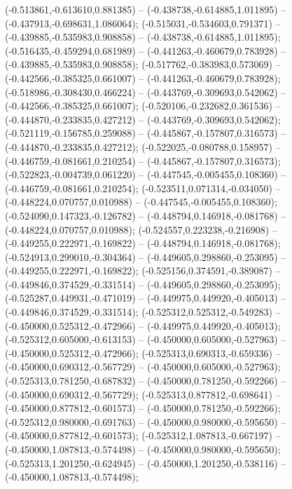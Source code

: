  (-0.513861,-0.613610,0.881385) -- (-0.438738,-0.614885,1.011895) -- (-0.437913,-0.698631,1.086064);
 (-0.515031,-0.534603,0.791371) -- (-0.439885,-0.535983,0.908858) -- (-0.438738,-0.614885,1.011895);
 (-0.516435,-0.459294,0.681989) -- (-0.441263,-0.460679,0.783928) -- (-0.439885,-0.535983,0.908858);
 (-0.517762,-0.383983,0.573069) -- (-0.442566,-0.385325,0.661007) -- (-0.441263,-0.460679,0.783928);
 (-0.518986,-0.308430,0.466224) -- (-0.443769,-0.309693,0.542062) -- (-0.442566,-0.385325,0.661007);
 (-0.520106,-0.232682,0.361536) -- (-0.444870,-0.233835,0.427212) -- (-0.443769,-0.309693,0.542062);
 (-0.521119,-0.156785,0.259088) -- (-0.445867,-0.157807,0.316573) -- (-0.444870,-0.233835,0.427212);
 (-0.522025,-0.080788,0.158957) -- (-0.446759,-0.081661,0.210254) -- (-0.445867,-0.157807,0.316573);
 (-0.522823,-0.004739,0.061220) -- (-0.447545,-0.005455,0.108360) -- (-0.446759,-0.081661,0.210254);
 (-0.523511,0.071314,-0.034050) -- (-0.448224,0.070757,0.010988) -- (-0.447545,-0.005455,0.108360);
 (-0.524090,0.147323,-0.126782) -- (-0.448794,0.146918,-0.081768) -- (-0.448224,0.070757,0.010988);
 (-0.524557,0.223238,-0.216908) -- (-0.449255,0.222971,-0.169822) -- (-0.448794,0.146918,-0.081768);
 (-0.524913,0.299010,-0.304364) -- (-0.449605,0.298860,-0.253095) -- (-0.449255,0.222971,-0.169822);
 (-0.525156,0.374591,-0.389087) -- (-0.449846,0.374529,-0.331514) -- (-0.449605,0.298860,-0.253095);
 (-0.525287,0.449931,-0.471019) -- (-0.449975,0.449920,-0.405013) -- (-0.449846,0.374529,-0.331514);
 (-0.525312,0.525312,-0.549283) -- (-0.450000,0.525312,-0.472966) -- (-0.449975,0.449920,-0.405013);
 (-0.525312,0.605000,-0.613153) -- (-0.450000,0.605000,-0.527963) -- (-0.450000,0.525312,-0.472966);
 (-0.525313,0.690313,-0.659336) -- (-0.450000,0.690312,-0.567729) -- (-0.450000,0.605000,-0.527963);
 (-0.525313,0.781250,-0.687832) -- (-0.450000,0.781250,-0.592266) -- (-0.450000,0.690312,-0.567729);
 (-0.525313,0.877812,-0.698641) -- (-0.450000,0.877812,-0.601573) -- (-0.450000,0.781250,-0.592266);
 (-0.525312,0.980000,-0.691763) -- (-0.450000,0.980000,-0.595650) -- (-0.450000,0.877812,-0.601573);
 (-0.525312,1.087813,-0.667197) -- (-0.450000,1.087813,-0.574498) -- (-0.450000,0.980000,-0.595650);
 (-0.525313,1.201250,-0.624945) -- (-0.450000,1.201250,-0.538116) -- (-0.450000,1.087813,-0.574498);
